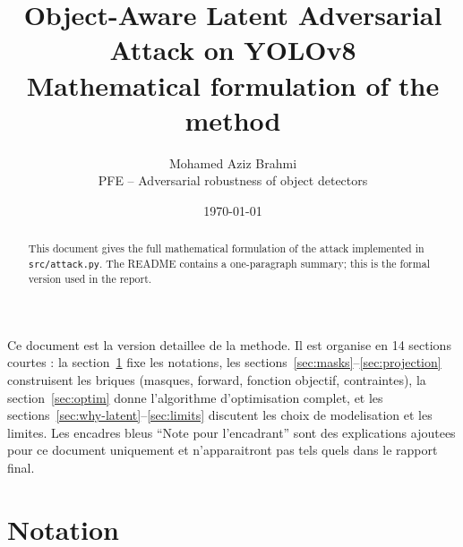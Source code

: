 \documentclass[11pt,a4paper]{article}
\title{\bfseries Object-Aware Latent Adversarial Attack on YOLOv8 \\
       \large Mathematical formulation of the method}
\author{Mohamed Aziz Brahmi \\
        \small PFE -- Adversarial robustness of object detectors}
\date{\today}
\begin{document}
\maketitle

\begin{abstract}
\noindent This document gives the full mathematical formulation of the attack
implemented in \texttt{src/attack.py}. The README contains a one-paragraph
summary; this is the formal version used in the report.
\end{abstract}

\begin{supervisornote}
Ce document est la version detaillee de la methode. Il est organise en 14
sections courtes : la section~\ref{sec:notation} fixe les notations, les
sections~\ref{sec:masks}--\ref{sec:projection} construisent les briques (masques,
forward, fonction objectif, contraintes), la section~\ref{sec:optim} donne
l'algorithme d'optimisation complet, et les sections~\ref{sec:why-latent}--\ref{sec:limits}
discutent les choix de modelisation et les limites. Les encadres bleus
``Note pour l'encadrant'' sont des explications ajoutees pour ce document
uniquement et n'apparaitront pas tels quels dans le rapport final.
\end{supervisornote}

\section{Notation}\label{sec:notation}
\end{document}
